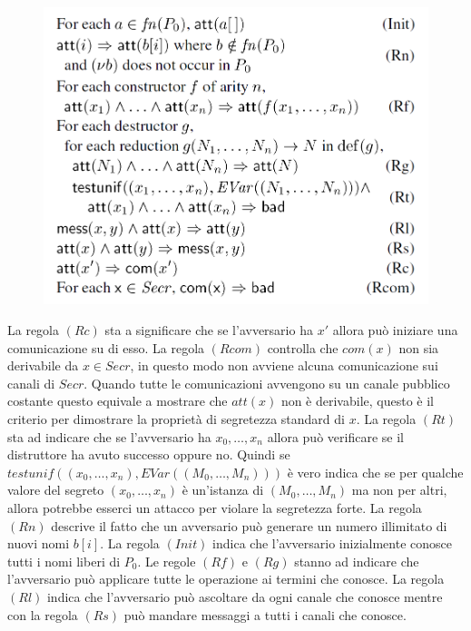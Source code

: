\documentclass[12pt]{article}
\begin{document}
\begin{figure}[ht]
    \centering
    \includegraphics[scale=0.4]{Relazione/Immagini/term_rule.PNG}
\end{figure}
La regola $(Rc)$ sta a significare che se l'avversario ha $x'$ allora può iniziare una comunicazione su di esso. La regola $(Rcom)$ controlla che $com(x)$ non sia derivabile da $x \in Secr$, in questo modo non avviene alcuna comunicazione sui canali di  $Secr$. Quando tutte le comunicazioni avvengono su un canale pubblico costante questo equivale a mostrare che $att(x)$ non è derivabile, questo è il criterio per dimostrare la proprietà di segretezza standard di $x$. La regola $(Rt)$ sta ad indicare che se l'avversario ha $x_0,\dots,x_n$ allora può verificare se il distruttore ha avuto successo oppure no. Quindi se $testunif((x_0,\dots,x_n),EVar((M_0,\dots,M_n)))$ è vero indica che se per qualche valore del segreto $(x_0,\dots,x_n)$ è un'istanza di $(M_0,\dots,M_n)$ ma non per altri, allora potrebbe esserci un attacco per violare la segretezza forte. La regola $(Rn)$ descrive il fatto che un avversario può generare un numero illimitato di nuovi nomi $b[i]$. La regola $(Init)$ indica che l'avversario inizialmente conosce tutti i nomi liberi di $P_0$. Le regole $(Rf)$ e $(Rg)$ stanno ad indicare che l'avversario può applicare tutte le operazione ai termini che conosce. La regola $(Rl)$ indica che l'avversario può ascoltare da ogni canale che conosce mentre con la regola $(Rs)$ può mandare messaggi a tutti i canali che conosce.\\
\end{document}
